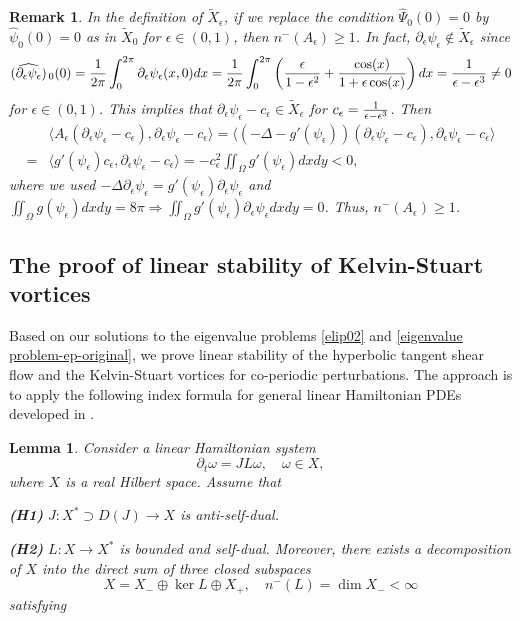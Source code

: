 \documentclass[1 [leqno, 11pt]{amsart}
\numberwithin{equation}{section}
\let\ep=\epsilon
\newtheorem{lemma}[Theorem]{Lemma}
\newtheorem{remark}[Theorem]{Remark}
\begin{document}
\begin{CJK*}{GBK}{song}
\begin{remark}
In the definition of $\tilde X_\epsilon$, if we replace the condition $\widehat\Psi_0(0)=0$ by $\widehat \psi_0(0)=0$  as in $\tilde X_0$ for $\ep\in(0,1)$, then $n^-(A_\ep)\geq1$. In fact,
$\partial_\ep\psi_\ep\not\in \tilde X_\ep$ since
\begin{align*}
(\widehat{\partial_\ep\psi_\ep})_{\,0}(0)={1\over 2\pi}\int_0^{2\pi}\partial_\ep\psi_\ep(x,0)dx={1\over 2\pi}\int_0^{2\pi}\left({\epsilon\over 1-\epsilon^2}+{\cos(x)\over 1+\ep\cos(x)}\right)dx={1\over \ep-\ep^3}\neq0
\end{align*}
for $\ep\in(0,1)$. This implies that $\partial_\ep\psi_\ep-c_\ep\in\tilde X_\ep$ for $c_\ep={1\over \ep-\ep^3}$. Then
\begin{align*}
&\langle A_\ep(\partial_\ep\psi_\ep-c_\ep),\partial_\ep\psi_\ep-c_\ep\rangle=\langle(-\Delta -g'(\psi_\ep))(\partial_\ep\psi_\ep-c_\ep),\partial_\ep\psi_\ep-c_\ep\rangle\\
=&\langle g'(\psi_\ep)c_\ep,\partial_\ep\psi_\ep-c_\ep\rangle=-c_\ep^2\iint_{\Omega}g'(\psi_\ep)dxdy<0,
\end{align*}
where we used $-\Delta\partial_\ep\psi_\ep=g'(\psi_\ep)\partial_\ep\psi_\ep$ and $\iint_{\Omega} g(\psi_\ep)dxdy=8\pi\Longrightarrow\iint_{\Omega} g'(\psi_\ep)\partial_\ep \psi_\ep dxdy=0$. Thus, $n^-(A_\ep)\geq1$.
\end{remark}
\subsection{The proof of linear stability of Kelvin-Stuart vortices}
Based on our solutions to  the eigenvalue problems \eqref{elip02} and \eqref{eigenvalue problem-ep-original}, we  prove linear stability of the hyperbolic tangent shear flow and the Kelvin-Stuart vortices for  co-periodic perturbations. The approach is to apply the following index formula for general linear Hamiltonian PDEs developed in \cite{lin2022instability}.

\begin{lemma}
\label{theorem-index}
Consider a linear Hamiltonian system
$$\partial_t \omega = JL\omega, \quad \omega \in X,$$
where $X$ is a real Hilbert space.
Assume that

{\rm \textbf{(H1)}} $J:X^{\ast} \supset D(J)  \rightarrow X$ is anti-self-dual.

{\rm \textbf{(H2)}} $L:X\rightarrow X^{\ast}$ is bounded and self-dual. Moreover, there exists a decomposition of $X$ into the direct sum of three closed subspaces
$$X=X_{-}\oplus\ker L\oplus X_{+}, \quad n^-(L)= \dim X_- < \infty$$ satisfying


\end{lemma}
\end{CJK*}
\end{document}

